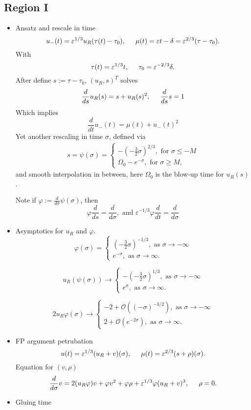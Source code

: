 \documentclass[letterpaper,11pt]{article}
\newcommand{\rmO}{\mathcal{O}}
\newcommand{\eps}{\varepsilon}
\numberwithin{equation}{section}
\theoremstyle{plain}
\begin{document}
\subsection{Region I}
\begin{itemize}
\item Ansatz and rescale in time
\[
u_-(t)= \eps^{1/3}u_R(\tau(t)-\tau_0), \hspace{0.2in}\mu(t) = \eps t -\delta = \eps^{2/3}(\tau-\tau_0).
\] 
With 
\[
\tau(t)=\eps^{1/3}t, \hspace{0.2in} \tau_0 = \eps^{-2/3}\delta.
\]
After define $s:= \tau-\tau_0$, $(u_R, s)^T$ solves
\[
\frac{d}{ds} u_R(s) = s+u_R(s)^2, \hspace{0.2in} \frac{d}{ds} s=1 
\]
Which implies 
\[
\frac{d}{dt} u_-(t) = \mu(t) + u_-(t)^2
\]
Yet another rescaling in time $\sigma$, defined via 
\begin{align*}
s = \psi(\sigma) =\begin{cases}
-(-\frac{3}{2} \sigma)^{2/3} , \text{ for }\sigma \le -M\\
\Omega_0 -e^{-\sigma}, \text{ for }\sigma \ge M,
\end{cases}
\end{align*}
and smooth interpolation in between, here $\Omega_0$ is the blow-up time for $u_R(s)$. 

Note if $\varphi:=\frac{d}{d\sigma}\psi(\sigma)$, then
\[
\varphi\frac{d}{ds} = \frac{d}{d\sigma}, \text{ and }\eps^{-1/3}\varphi \frac{d}{dt} = \frac{d}{d\sigma}
\]
\item Asymptotics for $u_R$ and $\varphi$.
\begin{equation*}
\varphi(\sigma) =\begin{cases}
 (-\frac{3}{2}\sigma)^{-1/3}, \text{ as }\sigma \to -\infty\\
e^{-\sigma} , \text{ as }\sigma \to \infty.
\end{cases}
\end{equation*}

\begin{equation*}
u_R(\psi(\sigma)) \to \begin{cases}
 -(-\frac{3}{2}\sigma)^{1/3}, \text{ as }\sigma \to -\infty\\
e^{\sigma} , \text{ as }\sigma \to \infty.
\end{cases}
\end{equation*}

\begin{equation*}
2u_R\varphi(\sigma) \to\begin{cases}
-2+ \rmO((-\sigma)^{-3/2}), \text{ as }\sigma \to -\infty\\
2+ \rmO(e^{-2\sigma}), \text{ as }\sigma \to \infty.
\end{cases}
\end{equation*}
\item FP argument
petrubation 
\[
u(t) = \eps^{1/3}(u_R+v)(\sigma), \hspace{0.2in} \mu(t) = \eps^{2/3}(s+\rho)(\sigma).
\]
Equation for $(v,\rho)$
\[
\frac{d}{d\sigma} v = 2(u_R\varphi) v+\varphi v^2 +\varphi\rho+\eps^{1/3}\varphi(u_R+v)^3, \hspace{ 0.2in } \rho = 0.
\]
\item Gluing time



\end{itemize}
\end{document}

